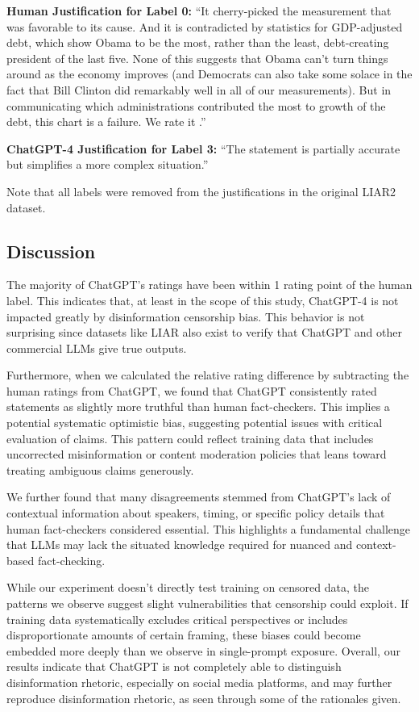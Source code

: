 \documentclass[conference=acm]{confpaper}
\begin{document}
\textbf{Human Justification for Label 0:} “It cherry-picked the measurement that was favorable to its cause. And it is contradicted by statistics for GDP-adjusted debt, which show Obama to be the most, rather than the least, debt-creating president of the last five. None of this suggests that Obama can't turn things around as the economy improves (and Democrats can also take some solace in the fact that Bill Clinton did remarkably well in all of our measurements). But in communicating which administrations contributed the most to growth of the debt, this chart is a failure. We rate it .”

\textbf{ChatGPT-4 Justification for Label 3:} “The statement is partially accurate but simplifies a more complex situation.”

Note that all labels were removed from the justifications in the original LIAR2 dataset.

\subsection{Discussion}

The majority of ChatGPT's ratings have been within 1 rating point of the human label. This indicates that, at least in the scope of this study, ChatGPT-4 is not impacted greatly by disinformation censorship bias. This behavior is not surprising since datasets like LIAR also exist to verify that ChatGPT and other commercial LLMs give true outputs.

Furthermore, when we calculated the relative rating difference by subtracting the human ratings from ChatGPT, we found that ChatGPT consistently rated statements as slightly more truthful than human fact-checkers. This implies a potential systematic optimistic bias, suggesting potential issues with critical evaluation of claims. This pattern could reflect training data that includes uncorrected misinformation or content moderation policies that leans toward treating ambiguous claims generously.

We further found that many disagreements stemmed from ChatGPT's lack of contextual information about speakers, timing, or specific policy details that human fact-checkers considered essential. This highlights a fundamental challenge that LLMs may lack the situated knowledge required for nuanced and context-based fact-checking.

While our experiment doesn't directly test training on censored data, the patterns we observe suggest slight vulnerabilities that censorship could exploit. If training data systematically excludes critical perspectives or includes disproportionate amounts of certain framing, these biases could become embedded more deeply than we observe in single-prompt exposure. Overall, our results indicate that ChatGPT is not completely able to distinguish disinformation rhetoric, especially on social media platforms, and may further reproduce disinformation rhetoric, as seen through some of the rationales given. 
\end{document}
